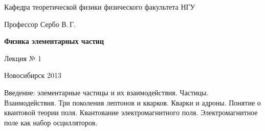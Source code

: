 \documentclass[12pt,pagesize,paper=192mm:108mm]{scrbook}
\begin{document}
\begin{titlepage}
\begin{center}
    Кафедра теоретической физики физического факультета НГУ
    \medskip

    \Large
    Профессор Сербо В.\,Г.
    \bigskip

    \huge
    \textbf{Физика элементарных частиц}
    \bigskip

    \Large
    Лекция № 1
    \vfill

    \normalsize
    \vfill

    \normalsize \ccbysa\hspace{0.5em}  Новосибирск 2013
  \end{center}
\end{titlepage}
\newpage

\vspace*{-1em}
\begin{center}
 \vfill
  \begin{minipage}{0.65\linewidth}
    Введение: элементарные частицы и их
    взаимодействия. Частицы. Взаимодействия. Три поколения лептонов и
    кварков. Кварки и адроны. Понятие о квантовой теории
    поля. Квантование электромагнитного поля. Электромагнитное поле
    как набор осцилляторов.
  \end{minipage}
  \vfill

\end{center}
\end{document}
